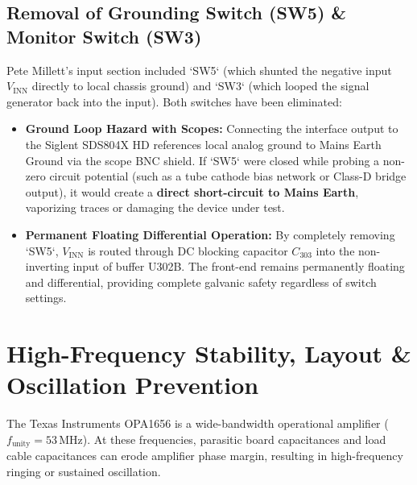 \documentclass[11pt, letterpaper]{article}
\begin{document}
\subsection{Removal of Grounding Switch (SW5) \& Monitor Switch (SW3)}
Pete Millett's input section included `SW5` (which shunted the negative input $V_{\text{INN}}$ directly to local chassis ground) and `SW3` (which looped the signal generator back into the input). Both switches have been eliminated:
\begin{itemize}[leftmargin=1.5em]
    \item \textbf{Ground Loop Hazard with Scopes:} Connecting the interface output to the Siglent SDS804X HD references local analog ground to Mains Earth Ground via the scope BNC shield. If `SW5` were closed while probing a non-zero circuit potential (such as a tube cathode bias network or Class-D bridge output), it would create a \textbf{direct short-circuit to Mains Earth}, vaporizing traces or damaging the device under test.
    \item \textbf{Permanent Floating Differential Operation:} By completely removing `SW5`, $V_{\text{INN}}$ is routed through DC blocking capacitor $C_{303}$ into the non-inverting input of buffer U302B. The front-end remains permanently floating and differential, providing complete galvanic safety regardless of switch settings.
\end{itemize}

\section{High-Frequency Stability, Layout \& Oscillation Prevention}

The Texas Instruments OPA1656 is a wide-bandwidth operational amplifier ($f_{\text{unity}} = 53\,\text{MHz}$). At these frequencies, parasitic board capacitances and load cable capacitances can erode amplifier phase margin, resulting in high-frequency ringing or sustained oscillation.
\end{document}
